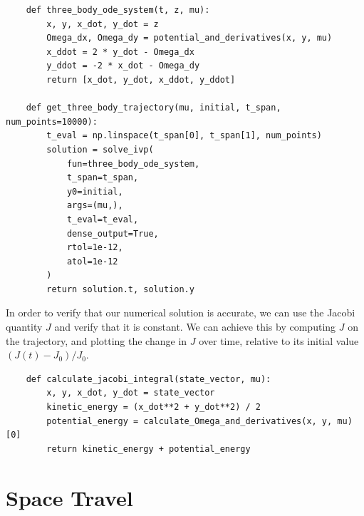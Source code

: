\documentclass{article}
\begin{document}
\begin{verbatim}
    def three_body_ode_system(t, z, mu):
        x, y, x_dot, y_dot = z
        Omega_dx, Omega_dy = potential_and_derivatives(x, y, mu)
        x_ddot = 2 * y_dot - Omega_dx
        y_ddot = -2 * x_dot - Omega_dy
        return [x_dot, y_dot, x_ddot, y_ddot]
    
    def get_three_body_trajectory(mu, initial, t_span, num_points=10000):
        t_eval = np.linspace(t_span[0], t_span[1], num_points)
        solution = solve_ivp(
            fun=three_body_ode_system,
            t_span=t_span,
            y0=initial,
            args=(mu,),
            t_eval=t_eval,
            dense_output=True,
            rtol=1e-12,
            atol=1e-12
        )
        return solution.t, solution.y
\end{verbatim}

In order to verify that our numerical solution is accurate, we can use the Jacobi quantity \(J\) and verify that it is constant. We can achieve this by computing \(J\) on the trajectory, and plotting the change in \(J\) over time, relative to its initial value \((J(t) - J_0) / J_0\).

\begin{verbatim}
    def calculate_jacobi_integral(state_vector, mu):
        x, y, x_dot, y_dot = state_vector
        kinetic_energy = (x_dot**2 + y_dot**2) / 2
        potential_energy = calculate_Omega_and_derivatives(x, y, mu)[0]
        return kinetic_energy + potential_energy
\end{verbatim}

\section{Space Travel}
\end{document}
